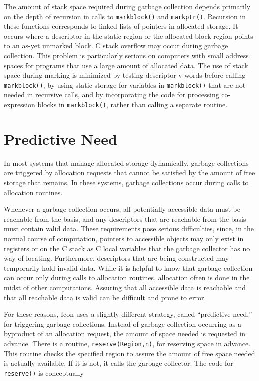 The amount of stack space required during garbage collection depends
primarily on the depth of recursion in calls to \texttt{markblock()}
and \texttt{markptr()}. Recursion in these functions corresponds to
linked lists of pointers in allocated storage. It occurs where a
descriptor in the static region or the allocated block region points
to an as-yet unmarked block. C stack overflow may occur during garbage
collection. This problem is particularly serious on computers with
small address spaces for programs that use a large amount of allocated
data. The use of stack space during marking is minimized by testing
descriptor v-words before calling \texttt{markblock()}, by using
static storage for variables in \texttt{markblock()} that are not
needed in recursive calls, and by incorporating the code for
processing co-expression blocks in \texttt{markblock()}, rather than
calling a separate routine.

\section{Predictive Need}

In most systems that manage allocated storage dynamically, garbage
collections are triggered by allocation requests that cannot be
satisfied by the amount of free storage that remains. In these
systems, garbage collections occur during calls to allocation routines.

Whenever a garbage collection occurs, all potentially accessible data
must be reachable from the basis, and any descriptors that are
reachable from the basis must contain valid data. These requirements
pose serious difficulties, since, in the normal course of computation,
pointers to accessible objects may only exist in registers or on the C
stack as C local variables that the garbage collector has no way of
locating. Furthermore, descriptors that are being constructed may
temporarily hold invalid data. While it is helpful to know that
garbage collection can occur only during calls to allocation routines,
allocation often is done in the midst of other computations. Assuring
that all accessible data is reachable and that all reachable data is
valid can be difficult and prone to error.

For these reasons, Icon uses a slightly different strategy, called
``predictive need,'' for triggering garbage collections. Instead of
garbage collection occurring as a byproduct of an allocation request,
the amount of space needed is requested in advance. There is a
routine, \texttt{reserve(Region,n)}, for reserving space in
advance. This routine checks the specified region to assure the amount
of free space needed is actually available. If it is not, it calls the
garbage collector. The code for \texttt{reserve()} is conceptually

